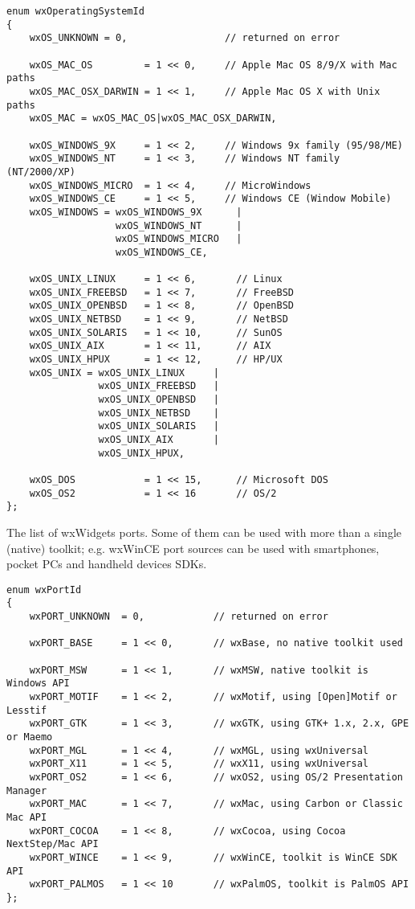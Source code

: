 \begin{verbatim}
enum wxOperatingSystemId
{
    wxOS_UNKNOWN = 0,                 // returned on error

    wxOS_MAC_OS         = 1 << 0,     // Apple Mac OS 8/9/X with Mac paths
    wxOS_MAC_OSX_DARWIN = 1 << 1,     // Apple Mac OS X with Unix paths
    wxOS_MAC = wxOS_MAC_OS|wxOS_MAC_OSX_DARWIN,

    wxOS_WINDOWS_9X     = 1 << 2,     // Windows 9x family (95/98/ME)
    wxOS_WINDOWS_NT     = 1 << 3,     // Windows NT family (NT/2000/XP)
    wxOS_WINDOWS_MICRO  = 1 << 4,     // MicroWindows
    wxOS_WINDOWS_CE     = 1 << 5,     // Windows CE (Window Mobile)
    wxOS_WINDOWS = wxOS_WINDOWS_9X      |
                   wxOS_WINDOWS_NT      |
                   wxOS_WINDOWS_MICRO   |
                   wxOS_WINDOWS_CE,

    wxOS_UNIX_LINUX     = 1 << 6,       // Linux
    wxOS_UNIX_FREEBSD   = 1 << 7,       // FreeBSD
    wxOS_UNIX_OPENBSD   = 1 << 8,       // OpenBSD
    wxOS_UNIX_NETBSD    = 1 << 9,       // NetBSD
    wxOS_UNIX_SOLARIS   = 1 << 10,      // SunOS
    wxOS_UNIX_AIX       = 1 << 11,      // AIX
    wxOS_UNIX_HPUX      = 1 << 12,      // HP/UX
    wxOS_UNIX = wxOS_UNIX_LINUX     |
                wxOS_UNIX_FREEBSD   |
                wxOS_UNIX_OPENBSD   |
                wxOS_UNIX_NETBSD    |
                wxOS_UNIX_SOLARIS   |
                wxOS_UNIX_AIX       |
                wxOS_UNIX_HPUX,

    wxOS_DOS            = 1 << 15,      // Microsoft DOS
    wxOS_OS2            = 1 << 16       // OS/2
};
\end{verbatim}

The list of wxWidgets ports. Some of them can be used with more than
a single (native) toolkit; e.g. wxWinCE port sources can be used with
smartphones, pocket PCs and handheld devices SDKs.

\begin{verbatim}
enum wxPortId
{
    wxPORT_UNKNOWN  = 0,            // returned on error

    wxPORT_BASE     = 1 << 0,       // wxBase, no native toolkit used

    wxPORT_MSW      = 1 << 1,       // wxMSW, native toolkit is Windows API
    wxPORT_MOTIF    = 1 << 2,       // wxMotif, using [Open]Motif or Lesstif
    wxPORT_GTK      = 1 << 3,       // wxGTK, using GTK+ 1.x, 2.x, GPE or Maemo
    wxPORT_MGL      = 1 << 4,       // wxMGL, using wxUniversal
    wxPORT_X11      = 1 << 5,       // wxX11, using wxUniversal
    wxPORT_OS2      = 1 << 6,       // wxOS2, using OS/2 Presentation Manager
    wxPORT_MAC      = 1 << 7,       // wxMac, using Carbon or Classic Mac API
    wxPORT_COCOA    = 1 << 8,       // wxCocoa, using Cocoa NextStep/Mac API
    wxPORT_WINCE    = 1 << 9,       // wxWinCE, toolkit is WinCE SDK API
    wxPORT_PALMOS   = 1 << 10       // wxPalmOS, toolkit is PalmOS API
};
\end{verbatim}

